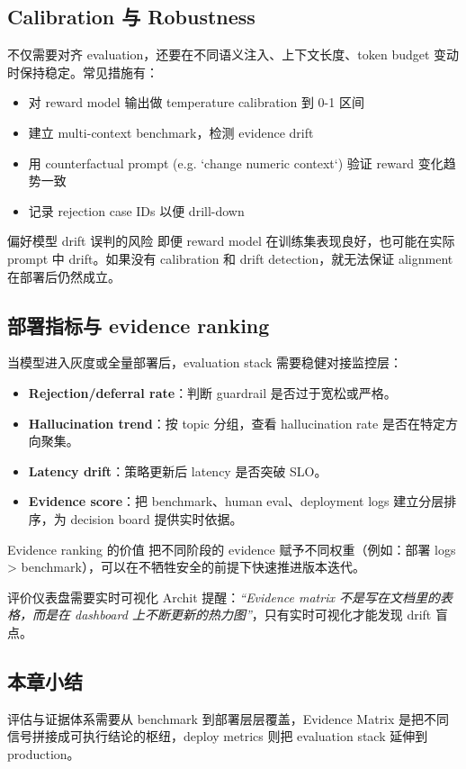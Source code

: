 \subsection{Calibration 与 Robustness}

不仅需要对齐 evaluation，还要在不同语义注入、上下文长度、token budget 变动时保持稳定。常见措施有：

\begin{itemize}
    \item 对 reward model 输出做 temperature calibration 到 0-1 区间
    \item 建立 multi-context benchmark，检测 evidence drift
    \item 用 counterfactual prompt (e.g. `change numeric context`) 验证 reward 变化趋势一致
    \item 记录 rejection case IDs 以便 drill-down
\end{itemize}

\begin{warningbox}{偏好模型 drift 误判的风险}
即便 reward model 在训练集表现良好，也可能在实际 prompt 中 drift。如果没有 calibration 和 drift detection，就无法保证 alignment 在部署后仍然成立。
\end{warningbox}

\subsection{部署指标与 evidence ranking}

当模型进入灰度或全量部署后，evaluation stack 需要稳健对接监控层：
\begin{itemize}
    \item \textbf{Rejection/deferral rate}：判断 guardrail 是否过于宽松或严格。
    \item \textbf{Hallucination trend}：按 topic 分组，查看 hallucination rate 是否在特定方向聚集。
    \item \textbf{Latency drift}：策略更新后 latency 是否突破 SLO。
    \item \textbf{Evidence score}：把 benchmark、human eval、deployment logs 建立分层排序，为 decision board 提供实时依据。
\end{itemize}

\begin{knowledgebox}{Evidence ranking 的价值}
把不同阶段的 evidence 赋予不同权重（例如：部署 logs > benchmark），可以在不牺牲安全的前提下快速推进版本迭代。
\end{knowledgebox}

\begin{importantbox}{评价仪表盘需要实时可视化}
Archit 提醒：\textit{``Evidence matrix 不是写在文档里的表格，而是在 dashboard 上不断更新的热力图''}，只有实时可视化才能发现 drift 盲点。
\end{importantbox}

\subsection{本章小结}

评估与证据体系需要从 benchmark 到部署层层覆盖，Evidence Matrix 是把不同信号拼接成可执行结论的枢纽，deploy metrics 则把 evaluation stack 延伸到 production。

